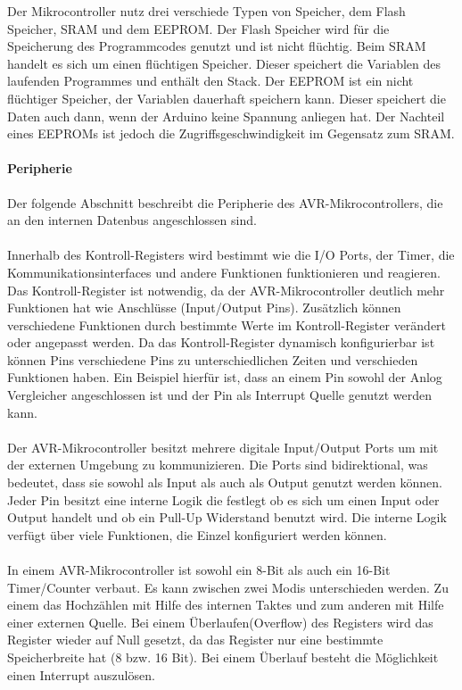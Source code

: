 Der Mikrocontroller nutz drei verschiede Typen von Speicher, dem Flash Speicher, SRAM und dem EEPROM. Der Flash Speicher wird für die Speicherung des Programmcodes genutzt und ist nicht flüchtig. Beim SRAM handelt es sich um einen flüchtigen Speicher. Dieser speichert die Variablen des laufenden Programmes und enthält den Stack. Der EEPROM ist ein nicht flüchtiger Speicher, der Variablen dauerhaft speichern kann. Dieser speichert die Daten auch dann, wenn der Arduino keine Spannung anliegen hat. Der Nachteil eines EEPROMs ist jedoch die Zugriffsgeschwindigkeit im Gegensatz zum SRAM.
\paragraph{Peripherie}
Der folgende Abschnitt beschreibt die Peripherie des AVR-Mikrocontrollers, die an den internen Datenbus angeschlossen sind.
\paragraph{}
Innerhalb des Kontroll-Registers wird bestimmt wie die I/O Ports, der Timer, die Kommunikationsinterfaces und andere Funktionen funktionieren und reagieren. Das Kontroll-Register ist notwendig, da der AVR-Mikrocontroller deutlich mehr Funktionen hat wie Anschlüsse (Input/Output Pins). Zusätzlich können verschiedene Funktionen durch bestimmte Werte im Kontroll-Register verändert oder angepasst werden. Da das Kontroll-Register dynamisch konfigurierbar ist können Pins verschiedene Pins zu unterschiedlichen Zeiten und verschieden Funktionen haben. Ein Beispiel hierfür ist,  dass an einem Pin sowohl der Anlog Vergleicher angeschlossen ist und der Pin als Interrupt Quelle genutzt werden kann.
\paragraph{}
Der AVR-Mikrocontroller besitzt mehrere digitale Input/Output Ports um mit der externen Umgebung zu kommunizieren. Die Ports sind bidirektional, was bedeutet,  dass sie sowohl als Input als auch als Output genutzt werden können. Jeder Pin besitzt eine interne Logik die festlegt ob es sich um einen Input oder Output handelt und ob ein Pull-Up Widerstand benutzt wird. Die interne Logik verfügt über viele Funktionen, die Einzel konfiguriert werden können.
\paragraph{}
In einem AVR-Mikrocontroller ist sowohl ein 8-Bit als auch ein 16-Bit Timer/Counter verbaut. Es kann zwischen zwei Modis unterschieden werden. Zu einem das Hochzählen mit Hilfe des internen Taktes und zum anderen mit Hilfe  einer externen Quelle. Bei einem Überlaufen(Overflow) des Registers wird das Register wieder auf Null gesetzt, da das Register nur eine bestimmte Speicherbreite hat (8 bzw. 16 Bit). Bei einem Überlauf besteht die Möglichkeit einen Interrupt auszulösen.
